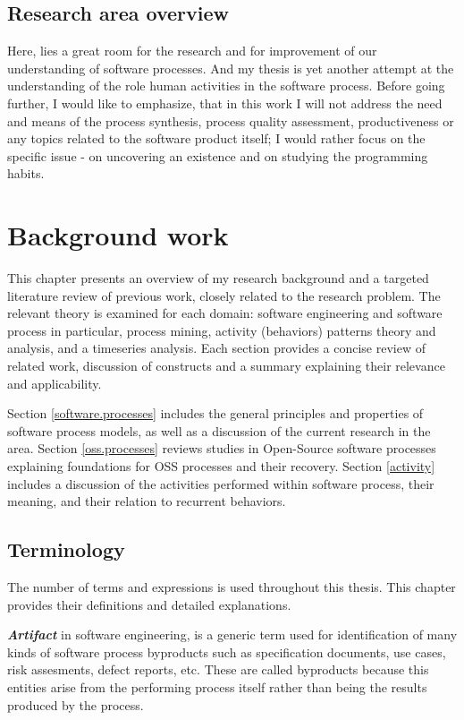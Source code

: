 \section{Research area overview}
Here, lies a great room for the research and for improvement of our understanding of software 
processes. And my thesis is yet another attempt at the understanding of the role human activities 
in the software process. Before going further, I would like to emphasize, that in this work I will not 
address the need and means of the process synthesis, process quality assessment, productiveness
or any topics related to the software product itself; I would rather focus on the specific issue - 
on uncovering an existence and on studying the programming habits. 

\chapter{Background work}
This chapter presents an overview of my research background and a targeted literature 
review of previous work, closely related to the research problem.
The relevant theory is examined for each domain: software engineering and software process
in particular, process mining, activity (behaviors) patterns theory and analysis, and 
a timeseries analysis. Each section provides a concise review of related work, discussion 
of constructs and a summary explaining their relevance and applicability. 

Section \ref{software.processes} includes the general principles and properties of 
software process models, as well as a discussion of the current research in the area.
Section \ref{oss.processes} reviews studies in Open-Source software processes
explaining foundations for OSS processes and their recovery.
Section \ref{activity} includes a discussion of the activities performed within software
process, their meaning, and their relation to recurrent behaviors.

\section{Terminology}\label{definitions}
The number of terms and expressions is used throughout this thesis. This chapter provides
their definitions and detailed explanations.

\textit{\textbf{Artifact}} in software engineering, is a generic term used for identification
of many kinds of software process byproducts such as specification documents, use cases, 
risk assesments, defect reports, etc. These are called byproducts because this entities
arise from the performing process itself rather than being the results produced by the process.

